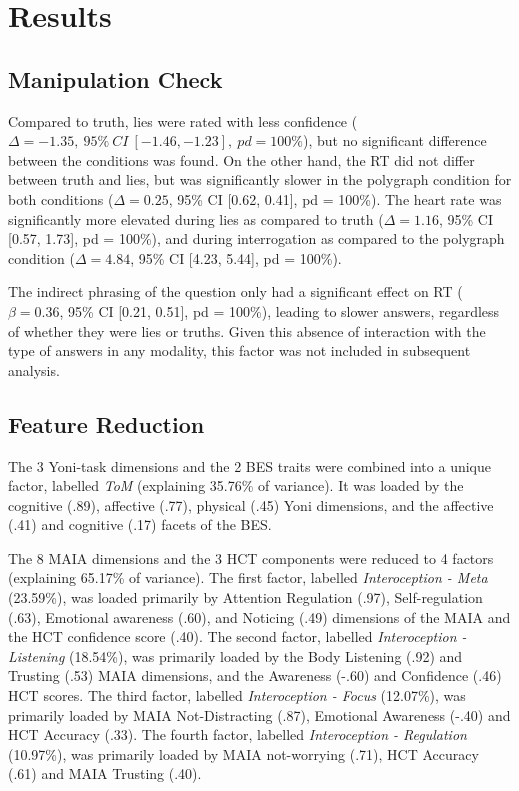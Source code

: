 \documentclass[
  man,mask,floatsintext]{apa6}
\begin{document}
\hypertarget{results}{%
\section{Results}\label{results}}

\hypertarget{manipulation-check}{%
\subsection{Manipulation Check}\label{manipulation-check}}

Compared to truth, lies were rated with less confidence (\(\Delta=-1.35,~95\%~CI~[-1.46, -1.23],~pd = 100\%\)), but no significant difference between the conditions was found. On the other hand, the RT did not differ between truth and lies, but was significantly slower in the polygraph condition for both conditions (\(\Delta=0.25\), 95\% CI {[}0.62, 0.41{]}, pd = 100\%). The heart rate was significantly more elevated during lies as compared to truth (\(\Delta=1.16\), 95\% CI {[}0.57, 1.73{]}, pd = 100\%), and during interrogation as compared to the polygraph condition (\(\Delta=4.84\), 95\% CI {[}4.23, 5.44{]}, pd = 100\%).

The indirect phrasing of the question only had a significant effect on RT (\(\beta=0.36\), 95\% CI {[}0.21, 0.51{]}, pd = 100\%), leading to slower answers, regardless of whether they were lies or truths. Given this absence of interaction with the type of answers in any modality, this factor was not included in subsequent analysis.

\hypertarget{feature-reduction}{%
\subsection{Feature Reduction}\label{feature-reduction}}

The 3 Yoni-task dimensions and the 2 BES traits were combined into a unique factor, labelled \emph{ToM} (explaining 35.76\% of variance). It was loaded by the cognitive (.89), affective (.77), physical (.45) Yoni dimensions, and the affective (.41) and cognitive (.17) facets of the BES.

The 8 MAIA dimensions and the 3 HCT components were reduced to 4 factors (explaining 65.17\% of variance). The first factor, labelled \emph{Interoception - Meta} (23.59\%), was loaded primarily by Attention Regulation (.97), Self-regulation (.63), Emotional awareness (.60), and Noticing (.49) dimensions of the MAIA and the HCT confidence score (.40). The second factor, labelled \emph{Interoception - Listening} (18.54\%), was primarily loaded by the Body Listening (.92) and Trusting (.53) MAIA dimensions, and the Awareness (-.60) and Confidence (.46) HCT scores. The third factor, labelled \emph{Interoception - Focus} (12.07\%), was primarily loaded by MAIA Not-Distracting (.87), Emotional Awareness (-.40) and HCT Accuracy (.33). The fourth factor, labelled \emph{Interoception - Regulation} (10.97\%), was primarily loaded by MAIA not-worrying (.71), HCT Accuracy (.61) and MAIA Trusting (.40).
\end{document}
